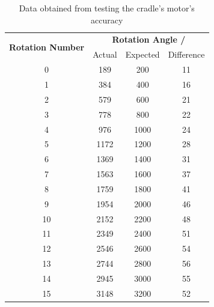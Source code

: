 \documentclass{report}
\newcommand{\tbo}[1]{\textbf{#1}}
\begin{document}
\begin{appendices}
		\begin{table}[h!]
			\def\arraystretch{1.25}
			\centering
			\caption{Data obtained from testing the cradle's motor's accuracy}
			\label{tab:cradleAccuracyTest}
			\begin{tabular}{cccc}
				\toprule
				\multirow{2}{*}{\parbox{0.1\textwidth}{\centering\tbo{Rotation Number}}} & \multicolumn{3}{c}{\tbo{Rotation Angle /\textdegree}} \\
				& Actual & Expected & Difference \\
				\midrule
				0 & 189 & 200 & 11 \\
				1 & 384 & 400 & 16 \\
				2 & 579 & 600 & 21 \\
				3 & 778 & 800 & 22 \\
				4 & 976 & 1000 & 24 \\
				5 & 1172 & 1200 & 28 \\
				6 & 1369 & 1400 & 31 \\
				7 & 1563 & 1600 & 37 \\
				8 & 1759 & 1800 & 41 \\
				9 & 1954 & 2000 & 46 \\
				10 & 2152 & 2200 & 48 \\
				11 & 2349 & 2400 & 51 \\
				12 & 2546 & 2600 & 54 \\
				13 & 2744 & 2800 & 56 \\
				14 & 2945 & 3000 & 55 \\
				15 & 3148 & 3200 & 52 \\
				\bottomrule
			\end{tabular}
		\end{table}


\end{appendices}
\end{document}
